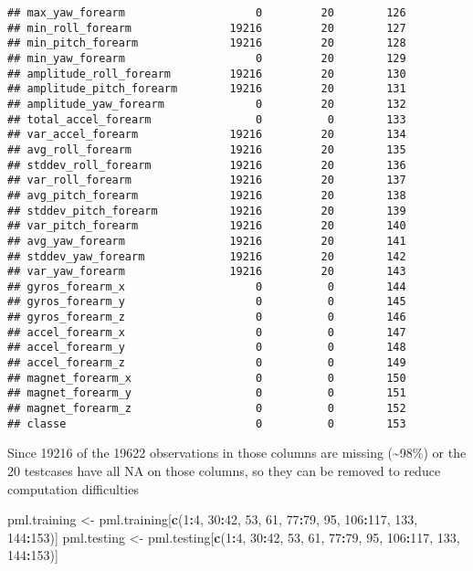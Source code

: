 \documentclass[]{article}
\newenvironment{Shaded}{\begin{snugshade}}{\end{snugshade}}
\newcommand{\KeywordTok}[1]{\textcolor[rgb]{0.13,0.29,0.53}{\textbf{#1}}}
\newcommand{\DecValTok}[1]{\textcolor[rgb]{0.00,0.00,0.81}{#1}}
\newcommand{\StringTok}[1]{\textcolor[rgb]{0.31,0.60,0.02}{#1}}
\newcommand{\OperatorTok}[1]{\textcolor[rgb]{0.81,0.36,0.00}{\textbf{#1}}}
\newcommand{\NormalTok}[1]{#1}
\begin{document}
\begin{verbatim}
## max_yaw_forearm                    0         20        126
## min_roll_forearm               19216         20        127
## min_pitch_forearm              19216         20        128
## min_yaw_forearm                    0         20        129
## amplitude_roll_forearm         19216         20        130
## amplitude_pitch_forearm        19216         20        131
## amplitude_yaw_forearm              0         20        132
## total_accel_forearm                0          0        133
## var_accel_forearm              19216         20        134
## avg_roll_forearm               19216         20        135
## stddev_roll_forearm            19216         20        136
## var_roll_forearm               19216         20        137
## avg_pitch_forearm              19216         20        138
## stddev_pitch_forearm           19216         20        139
## var_pitch_forearm              19216         20        140
## avg_yaw_forearm                19216         20        141
## stddev_yaw_forearm             19216         20        142
## var_yaw_forearm                19216         20        143
## gyros_forearm_x                    0          0        144
## gyros_forearm_y                    0          0        145
## gyros_forearm_z                    0          0        146
## accel_forearm_x                    0          0        147
## accel_forearm_y                    0          0        148
## accel_forearm_z                    0          0        149
## magnet_forearm_x                   0          0        150
## magnet_forearm_y                   0          0        151
## magnet_forearm_z                   0          0        152
## classe                             0          0        153
\end{verbatim}

Since 19216 of the 19622 observations in those columns are missing
(\textasciitilde{}98\%) or the 20 testcases have all NA on those
columns, so they can be removed to reduce computation difficulties

\begin{Shaded}
\begin{Highlighting}[]
\NormalTok{pml.training <-}\StringTok{ }\NormalTok{pml.training[}\KeywordTok{c}\NormalTok{(}\DecValTok{1}\OperatorTok{:}\DecValTok{4}\NormalTok{, }\DecValTok{30}\OperatorTok{:}\DecValTok{42}\NormalTok{, }\DecValTok{53}\NormalTok{, }\DecValTok{61}\NormalTok{, }\DecValTok{77}\OperatorTok{:}\DecValTok{79}\NormalTok{, }\DecValTok{95}\NormalTok{, }\DecValTok{106}\OperatorTok{:}\DecValTok{117}\NormalTok{, }\DecValTok{133}\NormalTok{, }\DecValTok{144}\OperatorTok{:}\DecValTok{153}\NormalTok{)]}
\NormalTok{pml.testing <-}\StringTok{ }\NormalTok{pml.testing[}\KeywordTok{c}\NormalTok{(}\DecValTok{1}\OperatorTok{:}\DecValTok{4}\NormalTok{, }\DecValTok{30}\OperatorTok{:}\DecValTok{42}\NormalTok{, }\DecValTok{53}\NormalTok{, }\DecValTok{61}\NormalTok{, }\DecValTok{77}\OperatorTok{:}\DecValTok{79}\NormalTok{, }\DecValTok{95}\NormalTok{, }\DecValTok{106}\OperatorTok{:}\DecValTok{117}\NormalTok{, }\DecValTok{133}\NormalTok{, }\DecValTok{144}\OperatorTok{:}\DecValTok{153}\NormalTok{)]}
\end{Highlighting}
\end{Shaded}
\end{document}
